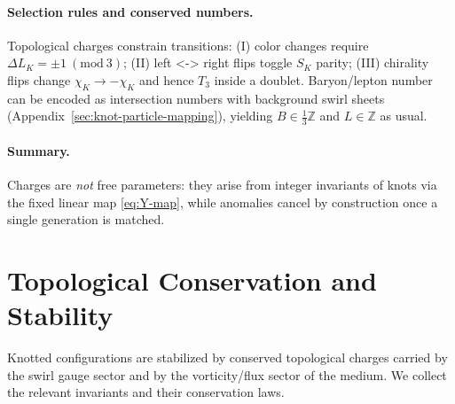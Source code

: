 \documentclass[smallextended]{svjour3}       %
\begin{document}
	\paragraph{Selection rules and conserved numbers.}
	Topological charges constrain transitions:
	(I) color changes require \(\Delta L_K=\pm1\ (\mathrm{mod}\ 3)\);
	(II) left <-> right flips toggle \(S_K\) parity;
	(III) chirality flips change \(\chi_K\to-\chi_K\) and hence \(T_3\) inside a doublet.
	Baryon/lepton number can be encoded as intersection numbers with background swirl sheets (Appendix~\ref{sec:knot-particle-mapping}), yielding \(B\in\tfrac{1}{3}\mathbb{Z}\) and \(L\in\mathbb{Z}\) as usual.

	\paragraph{Summary.}
	Charges are \emph{not} free parameters: they arise from integer invariants of knots via the fixed linear map \eqref{eq:Y-map}, while anomalies cancel by construction once a single generation is matched.

	\section{Topological Conservation and Stability}

	Knotted configurations are stabilized by conserved topological charges carried by the swirl gauge sector and by the vorticity/flux sector of the medium. We collect the relevant invariants and their conservation laws.
\end{document}
